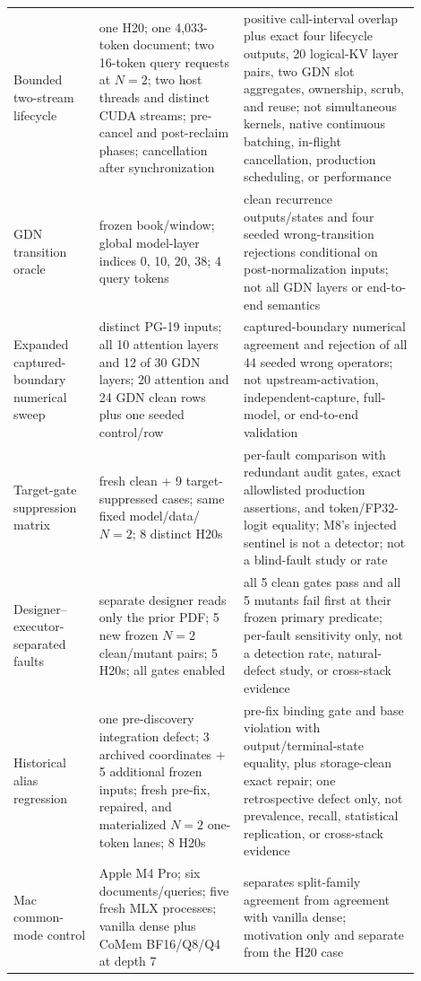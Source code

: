 \documentclass{article}
\begin{document}
\begin{longtable}{@{}>{\raggedright\arraybackslash}p{0.19\linewidth}>{\raggedright\arraybackslash}p{0.32\linewidth}>{\raggedright\arraybackslash}p{0.39\linewidth}@{}}
  Bounded two-stream lifecycle & one H20; one 4,033-token document; two 16-token query requests at $N=2$; two host threads and distinct CUDA streams; pre-cancel and post-reclaim phases; cancellation after synchronization & positive call-interval overlap plus exact four lifecycle outputs, 20 logical-KV layer pairs, two GDN slot aggregates, ownership, scrub, and reuse; not simultaneous kernels, native continuous batching, in-flight cancellation, production scheduling, or performance \\
  GDN transition oracle & 1 frozen book/window; global model-layer indices 0, 10, 20, 38; 4 query tokens & clean recurrence outputs/states and four seeded wrong-transition rejections conditional on post-normalization inputs; not all GDN layers or end-to-end semantics \\
  Expanded captured-boundary numerical sweep & 2 distinct PG-19 inputs; all 10 attention layers and 12 of 30 GDN layers; 20 attention and 24 GDN clean rows plus one seeded control/row & captured-boundary numerical agreement and rejection of all 44 seeded wrong operators; not upstream-activation, independent-capture, full-model, or end-to-end validation \\
  Target-gate suppression matrix & 9 fresh clean + 9 target-suppressed cases; same fixed model/data/$N=2$; 8 distinct H20s & per-fault comparison with redundant audit gates, exact allowlisted production assertions, and token/FP32-logit equality; M8's injected sentinel is not a detector; not a blind-fault study or rate \\
  Designer--executor-separated faults & separate designer reads only the prior PDF; 5 new frozen $N=2$ clean/mutant pairs; 5 H20s; all gates enabled & all 5 clean gates pass and all 5 mutants fail first at their frozen primary predicate; per-fault sensitivity only, not a detection rate, natural-defect study, or cross-stack evidence \\
  Historical alias regression & one pre-discovery integration defect; 3 archived coordinates + 5 additional frozen inputs; fresh pre-fix, repaired, and materialized $N=2$ one-token lanes; 8 H20s & pre-fix binding gate and base violation with output/terminal-state equality, plus storage-clean exact repair; one retrospective defect only, not prevalence, recall, statistical replication, or cross-stack evidence \\
  Mac common-mode control & Apple M4 Pro; six documents/queries; five fresh MLX processes; vanilla dense plus CoMem BF16/Q8/Q4 at depth 7 & separates split-family agreement from agreement with vanilla dense; motivation only and separate from the H20 case \\

\end{longtable}
\end{document}
